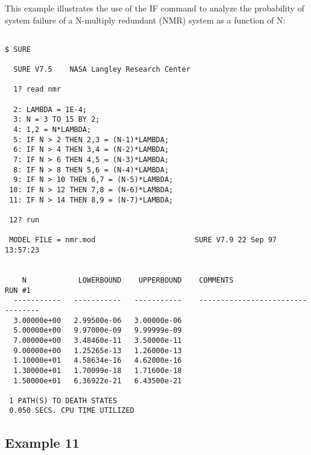 This example illustrates the use of the {\isf IF} command to analyze the
probability of system failure of a N-multiply redundant (NMR) system as a
function of N:
\begin{verbatim}

$ SURE

  SURE V7.5    NASA Langley Research Center

  1? read nmr

  2: LAMBDA = 1E-4;
  3: N = 3 TO 15 BY 2;
  4: 1,2 = N*LAMBDA;
  5: IF N > 2 THEN 2,3 = (N-1)*LAMBDA;
  6: IF N > 4 THEN 3,4 = (N-2)*LAMBDA;
  7: IF N > 6 THEN 4,5 = (N-3)*LAMBDA;
  8: IF N > 8 THEN 5,6 = (N-4)*LAMBDA;
  9: IF N > 10 THEN 6,7 = (N-5)*LAMBDA;
 10: IF N > 12 THEN 7,8 = (N-6)*LAMBDA;
 11: IF N > 14 THEN 8,9 = (N-7)*LAMBDA;

 12? run

 MODEL FILE = nmr.mod                       SURE V7.9 22 Sep 97  13:57:23


    N            LOWERBOUND    UPPERBOUND    COMMENTS                 RUN #1
  -----------   -----------   -----------    ---------------------------------
  3.00000e+00   2.99500e-06   3.00000e-06
  5.00000e+00   9.97000e-09   9.99999e-09
  7.00000e+00   3.48460e-11   3.50000e-11
  9.00000e+00   1.25265e-13   1.26000e-13
  1.10000e+01   4.58634e-16   4.62000e-16
  1.30000e+01   1.70099e-18   1.71600e-18
  1.50000e+01   6.36922e-21   6.43500e-21

 1 PATH(S) TO DEATH STATES
 0.050 SECS. CPU TIME UTILIZED
\end{verbatim}

\subsection{Example 11}

